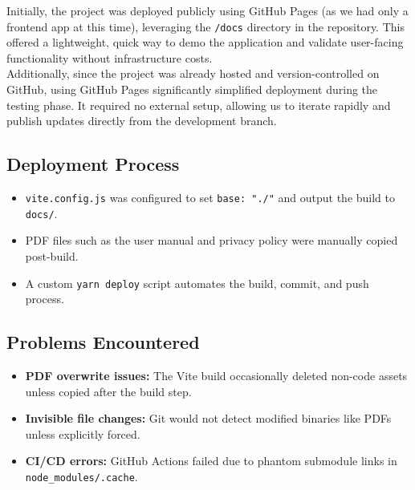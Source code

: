 \documentclass[a4paper,12pt]{article}
\begin{document}
Initially, the project was deployed publicly using GitHub Pages (as we had only a frontend app at this time), leveraging the \texttt{/docs} directory in the repository. This offered a lightweight, quick way to demo the application and validate user-facing functionality without infrastructure costs.\\

Additionally, since the project was already hosted and version-controlled on GitHub, using GitHub Pages significantly simplified deployment during the testing phase. It required no external setup, allowing us to iterate rapidly and publish updates directly from the development branch.



\subsection*{Deployment Process}
\begin{itemize}
    \item \texttt{vite.config.js} was configured to set \texttt{base: "./"} and output the build to \texttt{docs/}.
    \item PDF files such as the user manual and privacy policy were manually copied post-build.
    \item A custom \texttt{yarn deploy} script automates the build, commit, and push process.
\end{itemize}

\subsection*{Problems Encountered}
\begin{itemize}
    \item \textbf{PDF overwrite issues:} The Vite build occasionally deleted non-code assets unless copied after the build step.
    \item \textbf{Invisible file changes:} Git would not detect modified binaries like PDFs unless explicitly forced.
    \item \textbf{CI/CD errors:} GitHub Actions failed due to phantom submodule links in \texttt{node\_modules/.cache}.
\end{itemize}
\end{document}
